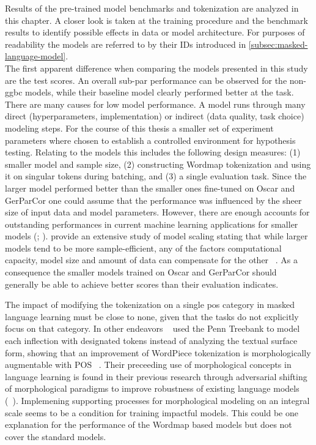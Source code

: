 Results of the pre-trained model benchmarks and tokenization are analyzed in this chapter.
A closer look is taken at the training procedure and the benchmark results to identify possible effects in data or model architecture.
For purposes of readability the models are referred to by their IDs introduced in \autoref{subsec:masked-language-model}.\\

The first apparent difference when comparing the models presented in this study are the test scores.
An overall sub-par performance can be observed for the non-ggbc models, while their baseline model clearly performed better at the task.
There are many causes for low model performance.
A model runs through many direct (hyperparameters, implementation) or indirect (data quality, task choice) modeling steps.
For the course of this thesis a smaller set of experiment parameters where chosen to establish a controlled environment for hypothesis testing.
Relating to the models this includes the following design measures: (1) smaller model and sample size, (2) constructing Wordmap tokenization and using it on singular tokens during batching, and (3) a single evaluation task.
Since the larger model performed better than the smaller ones fine-tuned on Oscar and GerParCor one could assume that the performance was influenced by the sheer size of input data and model parameters.
However, there are enough accounts for outstanding performances in current machine learning applications for smaller models (\textcite{smallmodelbigbang}; \textcite{fewshotTHREEpercent}).
\citeauthor{scalinglaws} provide an extensive study of model scaling stating that while larger models tend to be more sample-efficient, any of the factors computational capacity, model size and amount of data can compensate for the other ~\citeyear[3]{scalinglaws}.
As a consequence the smaller models trained on Oscar and GerParCor should generally be able to achieve better scores than their evaluation indicates.

The impact of modifying the tokenization on a single \ac{pos} category in masked language learning must be close to none, given that the tasks do not explicitly focus on that category.
In other endeavors ~\citeauthor{BITE} used the Penn Treebank to model each inflection with designated tokens instead of analyzing the textual surface form, showing that an improvement of WordPiece tokenization is morphologically augmentable with \ac{POS} ~\citeyear{BITE}.
Their preceeding use of morphological concepts in language learning is found in their previous research through adversarial shifting of morphological paradigms to improve robustness of existing language models (~\cite[2927]{adversarialmorphin}).
Implemening supporting processes for morphological modeling on an integral scale seems to be a condition for training impactful models.
This could be one explanation for the performance of the Wordmap based models but does not cover the standard models.

